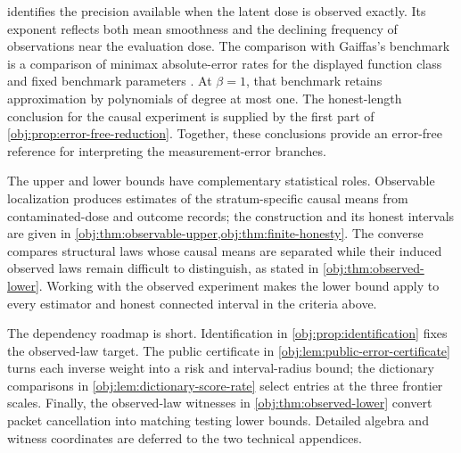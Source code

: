 \documentclass[11pt]{article}
\begin{document}

 identifies the precision available when the latent dose is observed exactly. Its exponent reflects both mean smoothness and the declining frequency of observations near the evaluation dose. The comparison with Gaiffas's benchmark is a comparison of minimax absolute-error rates for the displayed function class and fixed benchmark parameters \citep[Definition 2 and Theorem 1, equations (2.1), (2.4), and (2.5), pp.~3--4]{Gaiffas2005}. At \(\beta=1\), that benchmark retains approximation by polynomials of degree at most one. The honest-length conclusion for the causal experiment is supplied by the first part of \cref{obj:prop:error-free-reduction}. Together, these conclusions provide an error-free reference for interpreting the measurement-error branches.

The upper and lower bounds have complementary statistical roles. Observable localization produces estimates of the stratum-specific causal means from contaminated-dose and outcome records; the construction and its honest intervals are given in \cref{obj:thm:observable-upper,obj:thm:finite-honesty}. The converse compares structural laws whose causal means are separated while their induced observed laws remain difficult to distinguish, as stated in \cref{obj:thm:observed-lower}. Working with the observed experiment makes the lower bound apply to every estimator and honest connected interval in the criteria above.

The dependency roadmap is short. Identification in \cref{obj:prop:identification} fixes the observed-law target. The public certificate in \cref{obj:lem:public-error-certificate} turns each inverse weight into a risk and interval-radius bound; the dictionary comparisons in \cref{obj:lem:dictionary-score-rate} select entries at the three frontier scales. Finally, the observed-law witnesses in \cref{obj:thm:observed-lower} convert packet cancellation into matching testing lower bounds. Detailed algebra and witness coordinates are deferred to the two technical appendices.
\end{document}
